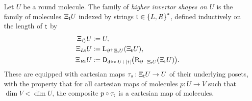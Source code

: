 \begin{dfn}  \label{dfn:higher_invertor_shape}
    Let \( U \) be a round molecule.
    The family of \emph{higher invertor shapes on \( U \)} is the family of molecules \( \Xi_{\mathsf{t}} U \) indexed by strings \( \mathsf{t} \in \left\{ {L, R} \right\}^* \), defined inductively on the length of \( \mathsf{t} \) by
    \begin{align*}
        \Xi_{\langle\rangle} U & \coloneqq U, \\
        \Xi_{L\mathsf{t}} U &\coloneqq \mathrm{L}_{\partial_{}^{+} \Xi_{\mathsf{t}} U} (\Xi_{\mathsf{t}} U), \\
        \Xi_{R\mathsf{t}} U &\coloneqq \mathsf{D}_{\dim U + |\mathsf{t}|}{\left(\mathrm{R}_{\partial_{}^{-} \Xi_{\mathsf{t}} U} (\Xi_{\mathsf{t}} U)\right)}.
    \end{align*}
	These are equipped with cartesian maps \( \tau_s \colon \Xi_{\mathsf{t}} U \to U \) of their underlying posets, with the property that for all cartesian maps of molecules \( p \colon U \to V \) such that \( \dim V < \dim U \), the composite \( p \circ \tau_{\mathsf{t}} \) is a cartesian map of molecules.
\end{dfn}

